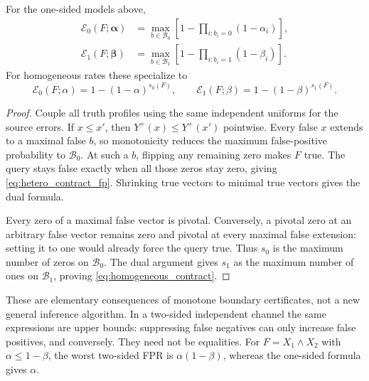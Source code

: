 \documentclass[../main.tex]{subfiles}
\begin{document}
\begin{theorem}
\label{thm:query_contract}
For the one-sided models above,
\begin{align}
 \mathcal E_0(F;\boldsymbol\alpha)
 &=\max_{b\in\mathcal B_0}
       \left[1-\prod_{i:b_i=0}(1-\alpha_i)\right],\label{eq:hetero_contract_fp}\\
 \mathcal E_1(F;\boldsymbol\beta)
 &=\max_{b\in\mathcal B_1}
       \left[1-\prod_{i:b_i=1}(1-\beta_i)\right].\label{eq:hetero_contract_fn}
\end{align}
For homogeneous rates these specialize to
\begin{equation}
 \boxed{\mathcal E_0(F;\alpha)=1-(1-\alpha)^{s_0(F)}},\qquad
 \boxed{\mathcal E_1(F;\beta)=1-(1-\beta)^{s_1(F)}}.
 \label{eq:homogeneous_contract}
\end{equation}
\end{theorem}
\begin{proof}
Couple all truth profiles using the same independent uniforms for the
source errors. If $x\leq x'$, then $Y^+(x)\leq Y^+(x')$ pointwise.
Every false $x$ extends to a maximal false $b$, so monotonicity reduces
the maximum false-positive probability to $\mathcal B_0$. At such a $b$,
flipping any remaining zero makes $F$ true. The query stays false exactly
when all those zeros stay zero, giving \eqref{eq:hetero_contract_fp}.
Shrinking true vectors to minimal true vectors gives the dual formula.

Every zero of a maximal false vector is pivotal. Conversely, a pivotal
zero at an arbitrary false vector remains zero and pivotal at every maximal
false extension: setting it to one would already force the query true.
Thus $s_0$ is the maximum number of zeros on $\mathcal B_0$. The dual argument
gives $s_1$ as the maximum number of ones on $\mathcal B_1$, proving
\eqref{eq:homogeneous_contract}.
\end{proof}

These are elementary consequences of monotone boundary certificates, not
a new general inference algorithm. In a two-sided independent channel the
same expressions are upper bounds: suppressing false negatives can only
increase false positives, and conversely. They need not be equalities.
For $F=X_1\land X_2$ with $\alpha\leq1-\beta$, the worst two-sided FPR is
$\alpha(1-\beta)$, whereas the one-sided formula gives $\alpha$.
\end{document}
